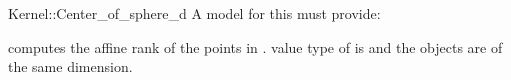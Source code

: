 \begin{ccRefFunctionObjectConcept}{Kernel::Center_of_sphere_d}
A model for this must provide:


{computes the affine rank of the points in \ccc{A = tuple [first,last)}.
\ccPrecond value type of  is 
and the objects are of the same dimension.}

\end{ccRefFunctionObjectConcept}
